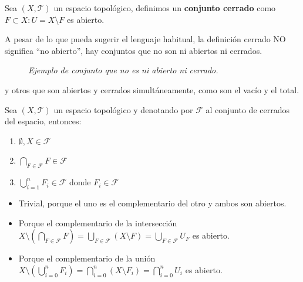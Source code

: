 \begin{defi}
Sea $\left( X, \mathcal{T} \right)$ un espacio topológico, definimos un \textbf{conjunto cerrado} como $F \subset X : U = X \setminus F$ es abierto.
\end{defi}
\begin{obs}
A pesar de lo que pueda sugerir el lenguaje habitual, la definición cerrado NO significa ``no abierto'', hay conjuntos que no son ni abiertos ni cerrados.
\begin{figure}[H]
    \centering
    \caption{\textit{Ejemplo de conjunto que no es ni abierto ni cerrado.}}
    \label{fig:observación-abiertos-y-cerrados.}
\end{figure}
y otros que son abiertos y cerrados simultáneamente, como son el vacío y el total.
\end{obs}

\begin{prop}
Sea $(X,\mathcal{T})$ un espacio topológico y denotando por $\mathcal{F}$ al conjunto de cerrados del espacio, entonces:
\begin{enumerate}
    \item $\emptyset, X \in \mathcal{F}$ 
    \item $\bigcap_{F \in \mathcal{F}} F \in \mathcal{F}$
    \item $\bigcup_{i=1}^n F_i \in \mathcal{F}$ donde $F_i \in \mathcal{F}$
\end{enumerate}
\end{prop}
\begin{demo}
\begin{itemize}
\item Trivial, porque el uno es el complementario del otro y ambos son abiertos.

\item Porque el complementario de la intersección $X\setminus \left(\bigcap_{F \in \mathcal{F}} F\right) = \bigcup_{F \in \mathcal{F}} \left( X \setminus F \right) = \bigcup_{F \in \mathcal{F}} U_F$ es abierto.

\item Porque el complementario de la unión $X\setminus \left(\bigcup_{i = 0}^n F_i\right) = \bigcap_{i=0}^n \left( X \setminus F_i\right) = \bigcap_{i=0}^n U_i$ es abierto.
\end{itemize}
\end{demo}

